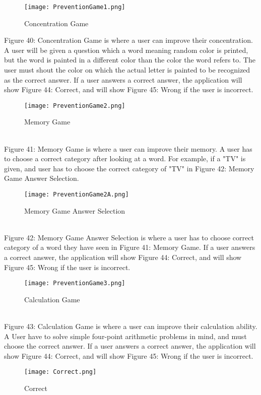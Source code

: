 \documentclass[conference]{IEEEtran}
\begin{document}
\begin{figure}[h]
\centerline{\texttt{[image: PreventionGame1.png]}}
\caption{Concentration Game}
\label{fig}
\end{figure}
Figure 40: Concentration Game is where a user can improve their concentration. A user will be given a question which a word meaning random color is printed, but the word is painted in a different color than the color the word refers to. The user must shout the color on which the actual letter is painted to be recognized as the correct answer. If a user answers a correct answer, the application will show Figure 44: Correct, and will show Figure 45: Wrong if the user is incorrect.
\\
\begin{figure}[h]
\centerline{\texttt{[image: PreventionGame2.png]}}
\caption{Memory Game}
\label{fig}
\end{figure}
\\
Figure 41: Memory Game is where a user can improve their memory. A user has to choose a correct category after looking at a word. For example, if a "TV" is given, and user has to choose the correct category of "TV" in Figure 42: Memory Game Answer Selection.
\\
\begin{figure}[h]
\centerline{\texttt{[image: PreventionGame2A.png]}}
\caption{Memory Game Answer Selection}
\label{fig}
\end{figure}
\\
Figure 42: Memory Game Answer Selection is where a user has to choose correct category of a word they have seen in Figure 41: Memory Game. If a user answers a correct answer, the application will show Figure 44: Correct, and will show Figure 45: Wrong if the user is incorrect.
\\
\clearpage
\begin{figure}[h]
\centerline{\texttt{[image: PreventionGame3.png]}}
\caption{Calculation Game}
\label{fig}
\end{figure}
\\
Figure 43: Calculation Game is where a user can improve their calculation ability. A User have to solve simple four-point arithmetic problems in mind, and must choose the correct answer. If a user answers a correct answer, the application will show Figure 44: Correct, and will show Figure 45: Wrong if the user is incorrect.
\\
\begin{figure}[h]
\centerline{\texttt{[image: Correct.png]}}
\caption{Correct}
\label{fig}
\end{figure}
\end{document}

